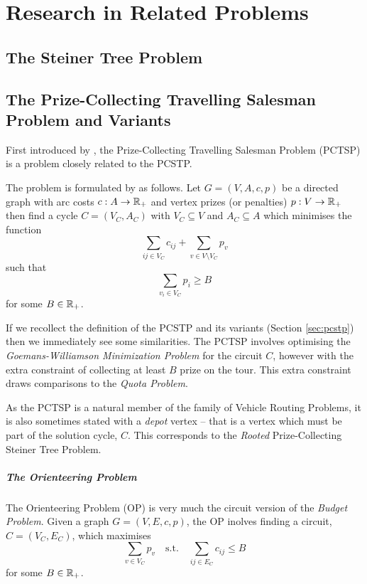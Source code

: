 \chapter{Research in Related Problems}
\label{chap:related}


\section{The Steiner Tree Problem}
\section{The Prize-Collecting Travelling Salesman Problem and Variants}
First introduced by \citet*{balas1989prize}, the Prize-Collecting Travelling Salesman Problem
(PCTSP) is a problem closely related to the
PCSTP.

The problem is formulated by \citeauthor{balas1989prize} as follows. Let
$G = (V, A, c, p)$ be a directed
graph with arc costs $c: A \to \mathbb{R}_+$ and vertex prizes (or penalties) $p: V \to \mathbb{R}_+$
then find a cycle $C = (V_C, A_C)$ with $V_C \subseteq V$ and $A_C \subseteq A$ which
minimises the function
$$\sum_{ij \in V_C} c_{ij} + \sum_{v \in V \setminus V_C} p_v$$
such that
$$\sum_{v_i \in V_C} p_i \geq B$$
for some $B \in \mathbb{R}_+$.

If we recollect the definition of the PCSTP and its variants (Section \ref{sec:pcstp}) then
we immediately see some similarities. The PCTSP involves optimising the
\textit{Goemans-Williamson Minimization Problem} for the circuit $C$, however with the extra
constraint of collecting at least $B$ prize on the tour. This extra constraint draws comparisons
to the \textit{Quota Problem}.

As the PCTSP is a natural member of the family of Vehicle Routing Problems, it is also sometimes
stated with a \textit{depot} vertex \citep{feillet2005traveling} -- that is a vertex which
must be part of the solution cycle, $C$. This corresponds to the \textit{Rooted}
Prize-Collecting Steiner Tree Problem.

\paragraph{The Orienteering Problem}
The Orienteering Problem (OP) is very much the circuit version of the \textit{Budget Problem}.
Given a graph $G  = (V, E, c, p)$, the OP inolves finding a circuit, $C = (V_C, E_C)$,
which maximises
$$\sum_{v \in V_C}  p_v \quad \text{s.t.} \quad \sum_{ij \in E_C} c_{ij} \leq B$$
for some $B \in \mathbb{R}_+$.
